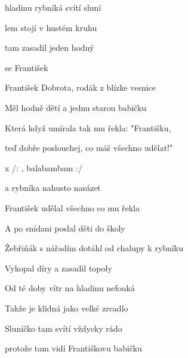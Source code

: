 

\zs
{} hladinu rybníká svítí sluní

lem stojí v hustém kruhu 

 tam zasadil jeden hodný 

 se František 

\ks \zs
František Dobrota, rodák z blízke vesnice

Měl hodně dětí a jednu starou babičku

Která když umírala tak mu řekla: "Františku,

teď dobře poslouchej, co máš všechno udělat!"
\ks

 x /: , balabambam    :/

a  rybníka nahusto nasázet 
\kr

\zs
František udělal všechno co mu řekla

A po snídani poslal děti do školy

Žebřiňák s nářadím dotáhl od chalupy k rybníku

Vykopal díry a zasadil topoly

\ks \zs
Od té doby vítr na hladinu nefouká

Takže je klidná jako velké zrcadlo

Sluníčko tam svítí vždycky rádo

protože tam vidí Františkovu babičku
\ks

\kp







